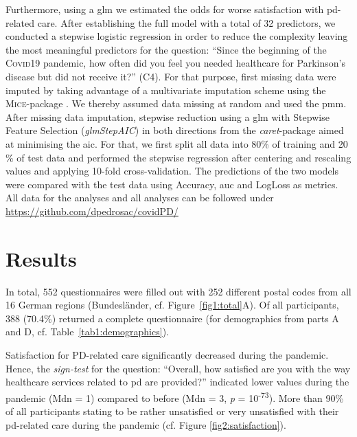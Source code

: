 \documentclass{bmcart}
\begin{document}
Furthermore, using a \ac{glm} we estimated the odds for worse satisfaction with \ac{pd}-related care. After establishing the full model with a total of 32 predictors, we conducted a stepwise logistic regression in order to reduce the complexity leaving the most meaningful predictors for the question: ``Since the beginning of the \textsc{Covid}19 pandemic, how often did you feel you needed healthcare for Parkinson’s disease but did not receive it?'' (C4). For that purpose, first missing data were imputed by taking advantage of a multivariate imputation scheme using the \textsc{Mice}-package \cite{vanbuuren2011}. We thereby assumed data missing at random and used the \ac{pmm}. After missing data imputation, stepwise reduction using a \ac{glm} with Stepwise Feature Selection (\textit{glmStepAIC}) in both directions from the \textit{caret}-package \cite{kuhn2008} aimed at minimising the \ac{aic}. For that, we first split all data into 80\% of training and 20 \% of test data and performed the stepwise regression after centering and rescaling values and applying 10-fold cross-validation. The predictions of the two models were compared with the test data using Accuracy, \ac{auc} and LogLoss as metrics. All data for the analyses and all analyses can be followed under \url{https://github.com/dpedrosac/covidPD/}

\newpage

\section*{Results}
In total, 552 questionnaires were filled out with 252 different postal codes from all 16 German regions (Bundesländer, cf. Figure~\ref{fig1:total}A). Of all participants, 388 (70.4$\%$) returned a complete questionnaire (for demographics from parts A and D, cf. Table~\ref{tab1:demographics}). 

Satisfaction for PD-related care significantly decreased during the pandemic. Hence, the \textit{sign-test} for the question: ``Overall, how satisfied are you with the way healthcare services related to \acl{pd} are provided?'' indicated lower values during the pandemic (Mdn = 1) compared to before (Mdn = 3, \textit{p} = 10\textsuperscript{-73}). More than 90\% of all participants stating to be rather unsatisfied or very unsatisfied with their \ac{pd}-related care during the pandemic (cf. Figure \ref{fig2:satisfaction}). 
\end{document}
